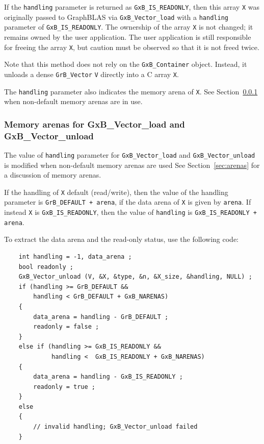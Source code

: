 If the \verb'handling' parameter is returned as \verb'GxB_IS_READONLY', then
this array \verb'X' was originally passed to GraphBLAS via
\verb'GxB_Vector_load' with a \verb'handling' parameter of
\verb'GxB_IS_READONLY'.  The ownership of the array \verb'X' is not changed; it
remains owned by the user application.  The user application is still
responsible for freeing the array \verb'X', but caution must be observed so
that it is not freed twice.

Note that this method does not rely on the \verb'GxB_Container' object.
Instead, it unloads a dense \verb'GrB_Vector' \verb'V' directly into a
C array \verb'X'.

The \verb'handling' parameter also indicates the memory arena of \verb'X'.
See Section~\ref{load_arena} when non-default memory arenas are in use.

\subsubsection{Memory arenas for {\sf GxB\_Vector\_load} and {\sf GxB\_Vector\_unload}}
\label{load_arena}

The value of \verb'handling' parameter for \verb'GxB_Vector_load' and
\verb'GxB_Vector_unload' is modified when non-default memory arenas are used
See Section~\ref{sec:arenas} for a discussion of memory arenas.

If the handling of \verb'X' default (read/write), then the value of the
handling parameter is \verb'GrB_DEFAULT + arena', if the data arena of \verb'X'
is given by \verb'arena'.  If instead \verb'X' is \verb'GxB_IS_READONLY', then
the value of \verb'handling' is \verb'GxB_IS_READONLY + arena'.

To extract the data arena and the read-only status, use the following code:

\newpage
{\footnotesize
\begin{verbatim}
    int handling = -1, data_arena ;
    bool readonly ;
    GxB_Vector_unload (V, &X, &type, &n, &X_size, &handling, NULL) ;
    if (handling >= GrB_DEFAULT &&
        handling < GrB_DEFAULT + GxB_NARENAS)
    {
        data_arena = handling - GrB_DEFAULT ;
        readonly = false ;
    }
    else if (handling >= GxB_IS_READONLY &&
             handling <  GxB_IS_READONLY + GxB_NARENAS)
    {
        data_arena = handling - GxB_IS_READONLY ;
        readonly = true ;
    }
    else
    {
        // invalid handling; GxB_Vector_unload failed
    } \end{verbatim}}

